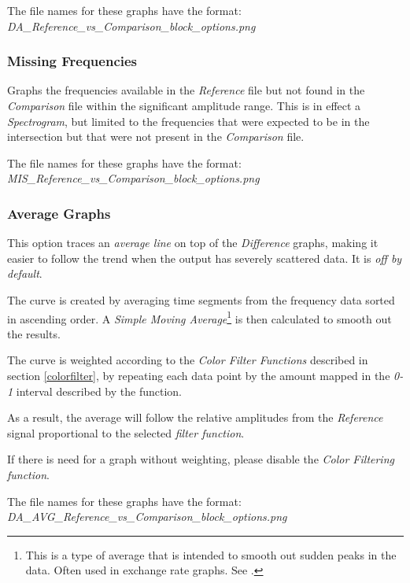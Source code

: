 \documentclass[10pt,a4paper]{report}
\begin{document}
\begin{appendices}
The file names for these graphs have the format:\\ \textit{DA\_Reference\_vs\_Comparison\_block\_options.png}

\subsubsection{Missing Frequencies} 

Graphs the frequencies available in the \textit{Reference} file but not found in the \textit{Comparison} file within the significant amplitude range. This is in effect a \textit{Spectrogram}, but limited to the frequencies that were expected to be in the intersection but that were not present in the \textit{Comparison} file.

The file names for these graphs have the format:\\ \textit{MIS\_Reference\_vs\_Comparison\_block\_options.png}

\subsubsection{Average Graphs}
\label{averaged}

This option traces an \textit{average line} on top of the \textit{Difference} graphs, making it easier to follow the trend when the output has severely scattered data. It is \textit{off by default}.

The curve is created by averaging time segments from the frequency data sorted in ascending order. A \textit{Simple Moving Average}\footnote{This is a type of average that is intended to smooth out sudden peaks in the data. Often used in exchange rate graphs. See \cite{sma}.} is then calculated to smooth out the results.

The curve is weighted according to the \textit{Color Filter Functions} described in section \ref{colorfilter}, by repeating each data point by the amount mapped in the \textit{0-1} interval described by the function.

As a result, the average will follow the relative amplitudes from the \textit{Reference} signal proportional to the selected \textit{filter function}.

If there is need for a graph without weighting, please disable the \textit{Color Filtering function}.

The file names for these graphs have the format:\\ \textit{DA\_AVG\_Reference\_vs\_Comparison\_block\_options.png}


\end{appendices}
\end{document}
